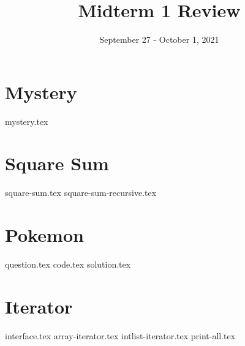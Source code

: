 \documentclass[11pt]{exam}
\title{Midterm 1 Review}
\date{September 27 - October 1, 2021}
\begin{document}
\maketitle

\section{Mystery}
\begin{questions}
{mystery.tex}
\end{questions}

\section{Square Sum}
\begin{questions}
{square-sum.tex}
{square-sum-recursive.tex}
\end{questions}

\pagebreak
\section{Pokemon}
\begin{questions}
{question.tex}
{code.tex}
{solution.tex}
\end{questions}

\pagebreak
\section{Iterator}
\begin{questions}
{interface.tex}
{array-iterator.tex}
{intlist-iterator.tex}
{print-all.tex}
\end{questions}
\end{document}
